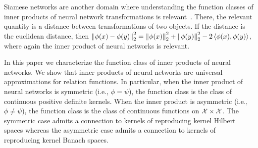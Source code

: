 Siamese networks are another domain where understanding the function classes of inner products of neural network transformations is relevant~\parencite[e.g.,][]{chopraLearningSimilarityMetric2005}. There, the relevant quantity is a distance between transformations of two objects. If the distance is the euclidean distance, then $\left\lVert\phi(x) - \phi(y)\right\rVert_{2}^2 = \left\lVert\phi(x)\right\rVert_{2}^2 + \left\lVert\phi(y)\right\rVert_{2}^2 - 2 \left \langle \phi(x), \phi(y) \right\rangle$, where again the inner product of neural networks is relevant.

In this paper we characterize the function class of inner products of neural networks. We show that inner products of neural networks are universal approximations for relation functions. In particular, when the inner product of neural networks is symmetric (i.e., $\phi=\psi$), the function class is the class of continuous positive definite kernels. When the inner product is asymmetric (i.e., $\phi \neq \psi$), the function class is the class of continuous functions on ${\mathcal{X}} \times {\mathcal{X}}$. The symmetric case admits a connection to kernels of reproducing kernel Hilbert spaces whereas the asymmetric case admits a connection to kernels of reproducing kernel Banach spaces.